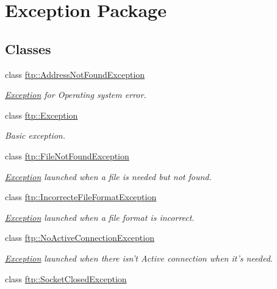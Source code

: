 \hypertarget{group__exception}{\section{Exception Package}
\label{group__exception}
}
\subsection*{Classes}
\begin{DoxyCompactItemize}
\item 
class \hyperlink{classftp_1_1_address_not_found_exception}{ftp\-::\-Address\-Not\-Found\-Exception}
\begin{DoxyCompactList}\small\item\em \hyperlink{classftp_1_1_exception}{Exception} for Operating system error. \end{DoxyCompactList}\item 
class \hyperlink{classftp_1_1_exception}{ftp\-::\-Exception}
\begin{DoxyCompactList}\small\item\em Basic exception. \end{DoxyCompactList}\item 
class \hyperlink{classftp_1_1_file_not_found_exception}{ftp\-::\-File\-Not\-Found\-Exception}
\begin{DoxyCompactList}\small\item\em \hyperlink{classftp_1_1_exception}{Exception} launched when a file is needed but not found. \end{DoxyCompactList}\item 
class \hyperlink{classftp_1_1_incorrecte_file_format_exception}{ftp\-::\-Incorrecte\-File\-Format\-Exception}
\begin{DoxyCompactList}\small\item\em \hyperlink{classftp_1_1_exception}{Exception} launched when a file format is incorrect. \end{DoxyCompactList}\item 
class \hyperlink{classftp_1_1_no_active_connection_exception}{ftp\-::\-No\-Active\-Connection\-Exception}
\begin{DoxyCompactList}\small\item\em \hyperlink{classftp_1_1_exception}{Exception} launched when there isn't Active connection when it's needed. \end{DoxyCompactList}\item 
class \hyperlink{classftp_1_1_socket_closed_exception}{ftp\-::\-Socket\-Closed\-Exception}

\end{DoxyCompactItemize}
